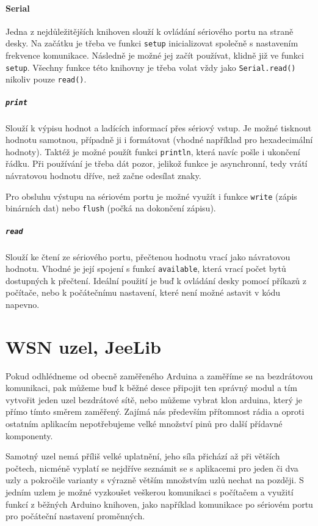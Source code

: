 \documentclass[12pt,titlepage]{article}
\begin{document}
		\paragraph{Serial}
			Jedna z nejdůležitějších knihoven slouží k ovládání sériového portu na straně desky. Na začátku je třeba ve funkci \texttt{setup} inicializovat společně s nastavením frekvence komunikace. Následně je možné jej začít používat, klidně již ve funkci \texttt{setup}. Všechny funkce této knihovny je třeba volat vždy jako \texttt{Serial.read()} nikoliv pouze \texttt{read()}.
			
			\subparagraph{\texttt{print}}
				Slouží k výpisu hodnot a ladících informací přes sériový vstup. Je možné tisknout hodnotu samotnou, případně ji i formátovat (vhodné například pro hexadecimální hodnoty). Taktéž je možné použít funkci \texttt{println}, která navíc pošle i ukončení řádku. Při používání je třeba dát pozor, jelikož funkce je 
				asynchronní, tedy vrátí návratovou hodnotu dříve, než začne odesílat znaky. 
				
				Pro obsluhu výstupu na sériovém portu je možné využít i funkce \texttt{write} (zápis binárních dat) nebo \texttt{flush} (počká na dokončení zápisu).
			
			\subparagraph{\texttt{read}}
				Slouží ke čtení ze sériového portu, přečtenou hodnotu vrací jako návratovou hodnotu. Vhodné je její spojení s funkcí \texttt{available}, která vrací počet bytů dostupných k přečtení. Ideální použití je buď k ovládání desky pomocí příkazů z počítače, nebo k počátečnímu nastavení, které není možné astavit v kódu napevno. 
		
\section{WSN uzel, JeeLib}
	
	Pokud odhlédneme od obecně zaměřeného Arduina a zaměříme se na bezdrátovou komunikaci, pak můžeme buď k běžné desce připojit ten správný modul a tím vytvořit jeden uzel bezdrátové sítě, nebo můžeme vybrat klon arduina, který je přímo tímto směrem zaměřený. Zajímá nás především přítomnost rádia a oproti ostatním aplikacím nepotřebujeme velké množství pinů pro další přídavné komponenty. 
	
	Samotný uzel nemá příliš velké uplatnění, jeho síla přichází až při větších počtech, nicméně vyplatí se nejdříve seznámit se s aplikacemi pro jeden či dva uzly a pokročile varianty s výrazně větším množstvím uzlů nechat na později. S jedním uzlem je možné vyzkoušet veškerou komunikaci s počítačem a využití funkcí z běžných Arduino knihoven, jako například komunikace po sériovém portu pro počáteční nastavení proměnných. 
	
\end{document}
